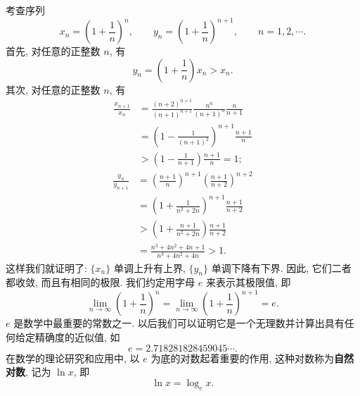 \documentclass[UTF8, 12pt, fontset=fandol, oneside]{ctexart}
\begin{document}
考查序列
\[
  x_n=\left(1+\frac1n\right)^n,\qquad
  y_n=\left(1+\frac1n\right)^{n+1},\qquad n=1,2,\cdots.
\]
首先, 对任意的正整数 $n$, 有
\[
  y_n=\left(1+\frac1n\right)x_n>x_n.
\]
其次, 对任意的正整数 $n$, 有
\[
\begin{aligned}
  \frac{x_{n+1}}{x_n}
  &=
  \frac{(n+2)^{n+1}}{(n+1)^{n+1}}\frac{n^n}{(n+1)^n}\frac n{n+1}\\
  &=
  \left(1-\frac1{(n+1)^2}\right)^{n+1}\frac{n+1}{n}\\
  &>
  \left(1-\frac1{n+1}\right)\frac{n+1}{n}
  =
  1;
\end{aligned}
\]
\[
\begin{aligned}
  \frac{y_n}{y_{n+1}}
  &=
  \left(\frac{n+1}{n}\right)^{n+1}
  \left(\frac{n+1}{n+2}\right)^{n+2}\\
  &=
  \left(1+\frac1{n^2+2n}\right)^{n+1}\frac{n+1}{n+2}\\
  &>
  \left(1+\frac{n+1}{n^2+2n}\right)\frac{n+1}{n+2}\\
  &=
  \frac{n^3+4n^2+4n+1}{n^3+4n^2+4n}>1.
\end{aligned}
\]
这样我们就证明了: $\{x_n\}$ 单调上升有上界, $\{y_n\}$ 单调下降有下界. 因此, 它们二者都收敛, 而且有相同的极限. 我们约定用字母 $e$ 来表示其极限值, 即
\[
  \lim_{n\to\infty}\left(1+\frac1n\right)^n
  =
  \lim_{n\to\infty}\left(1+\frac1n\right)^{n+1}
  =
  e.
\]
$e$ 是数学中最重要的常数之一. 以后我们可以证明它是一个无理数并计算出具有任何给定精确度的近似值, 如
\[
  e=2.718281828459045\cdots.
\]
在数学的理论研究和应用中, 以 $e$ 为底的对数起着重要的作用, 这种对数称为\textbf{自然对数}, 记为 $\ln x$, 即
\[
  \ln x=\log_e x.
\]
\end{document}
